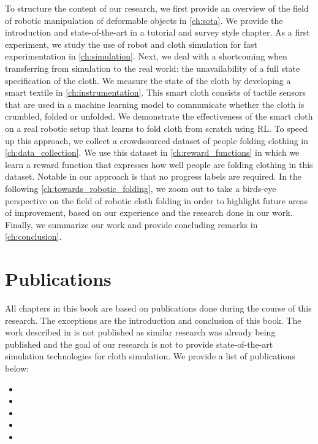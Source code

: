 \documentclass[\home/main.tex]{subfiles}
\begin{document}
To structure the content of our research, we first provide an overview of the field of robotic manipulation of deformable objects in \cref{ch:sota}. We provide the introduction and state-of-the-art in a tutorial and survey style chapter. As a first experiment, we study the use of robot and cloth simulation for fast experimentation in \cref{ch:simulation}. Next, we deal with a shortcoming when transferring from simulation to the real world: the unavailability of a full state specification of the cloth. We measure the state of the cloth by developing a smart textile in \cref{ch:instrumentation}. This smart cloth consists of tactile sensors that are used in a machine learning model to communicate whether the cloth is crumbled, folded or unfolded. We demonstrate the effectiveness of the smart cloth on a real robotic setup that learns to fold cloth from scratch using RL. To speed up this approach, we collect a crowdsourced dataset of people folding clothing in \cref{ch:data_collection}. We use this dataset in \cref{ch:reward_functions} in which we learn a reward function that expresses how well people are folding clothing in this dataset. Notable in our approach is that no progress labels are required.
In the following \cref{ch:towards_robotic_folding}, we zoom out to take a birds-eye perspective on the field of robotic cloth folding in order to highlight future areas of improvement, based on our experience and the research done in our work.
Finally, we summarize our work and provide concluding remarks in \cref{ch:conclusion}.

\section{Publications}
All chapters in this book are based on publications done during the course of this research. The exceptions are the introduction and conclusion of this book. The work described in  is not published as similar research was already being published and the goal of our research is not to provide state-of-the-art simulation technologies for cloth simulation. We provide a list of publications below:
\begin{itemize}
    \item {}
    \item {}
    \item {}
    \item {}
    \item {}
\end{itemize}
\end{document}
